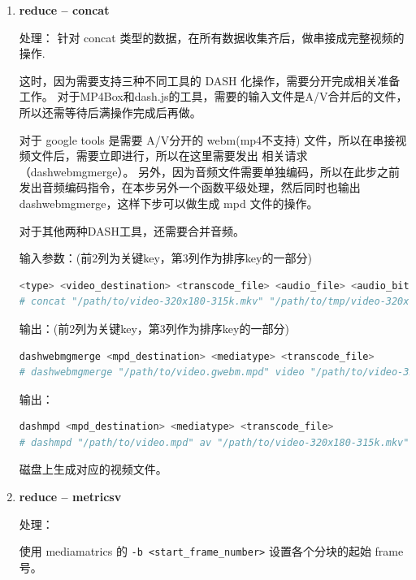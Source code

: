 \begin{enumerate}
\begin{lstlisting}[language=bash]
    -D stream.num.map.output.key.fields=3 \
    -D num.key.fields.for.partition=2 \
\end{lstlisting}

metrics 的记录为了能够打乱顺序（以便负载均衡），原有的 type,destination,trans 被设置为 type,trans,destination。

  \item \textbf{reduce -- concat}

处理：
针对 concat 类型的数据，在所有数据收集齐后，做串接成完整视频的操作.

这时，因为需要支持三种不同工具的 DASH 化操作，需要分开完成相关准备工作。
对于MP4Box和dash.js的工具，需要的输入文件是A/V合并后的文件，所以还需等待后满操作完成后再做。

对于 google tools 是需要 A/V分开的 webm(mp4不支持) 文件，所以在串接视频文件后，需要立即进行，所以在这里需要发出
相关请求（dashwebmgmerge）。
另外，因为音频文件需要单独编码，所以在此步之前发出音频编码指令，在本步另外一个函数平级处理，然后同时也输出 dashwebmgmerge，这样下步可以做生成 mpd 文件的操作。

对于其他两种DASH工具，还需要合并音频。

输入参数：(前2列为关键key，第3列作为排序key的一部分)
\begin{lstlisting}[language=bash]
<type> <video_destination> <transcode_file> <audio_file> <audio_bitrate>
# concat "/path/to/video-320x180-315k.mkv" "/path/to/tmp/video-320x180-315k-0000000000000000001.mkv" "/path/to/audio1.flac" 64k
\end{lstlisting}


输出：(前2列为关键key，第3列作为排序key的一部分)
\begin{lstlisting}[language=bash]
dashwebmgmerge <mpd_destination> <mediatype> <transcode_file>
# dashwebmgmerge "/path/to/video.gwebm.mpd" video "/path/to/video-320x180-315k.mkv"
\end{lstlisting}

输出：
\begin{lstlisting}[language=bash]
dashmpd <mpd_destination> <mediatype> <transcode_file>
# dashmpd "/path/to/video.mpd" av "/path/to/video-320x180-315k.mkv"
\end{lstlisting}

磁盘上生成对应的视频文件。

  \item \textbf{reduce -- metricsv}

处理：

使用 mediamatrics 的 \texttt{-b <start\_frame\_number>} 设置各个分块的起始 frame 号。


\end{enumerate}
